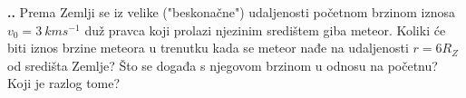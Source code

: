 
\noindent 
\textbf{
\thecjelina.\thezadatak.}
Prema Zemlji se iz velike ("beskonačne") udaljenosti početnom brzinom iznosa $v_0 =3\ kms^{-1}$
duž pravca koji prolazi njezinim središtem giba meteor. Koliki će biti iznos brzine
meteora u trenutku kada se meteor nađe na udaljenosti $r = 6R_Z$ od središta Zemlje? Što se
događa s njegovom brzinom u odnosu na početnu? Koji je razlog tome?

